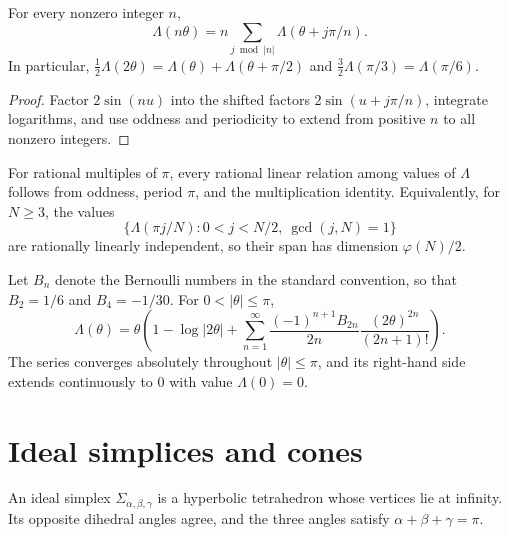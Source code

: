 \begin{lemma}
\label{thurston-ch07-lobachevsky-multiplication}

For every nonzero integer $n$,
\[
\Lambda(n\theta)=n\sum_{j\bmod |n|}\Lambda(\theta+j\pi/n).
\]
In particular, $\frac12\Lambda(2\theta)=\Lambda(\theta)+\Lambda(\theta+\pi/2)$ and $\frac32\Lambda(\pi/3)=\Lambda(\pi/6)$.
\end{lemma}
\begin{proof}
\sketch
Factor $2\sin(nu)$ into the shifted factors $2\sin(u+j\pi/n)$, integrate logarithms, and use oddness and periodicity to extend from positive $n$ to all nonzero integers.
\end{proof}

\begin{conjecture}
\label{thurston-ch07-lobachevsky-relations-conjecture}

For rational multiples of $\pi$, every rational linear relation among values of $\Lambda$ follows from oddness, period $\pi$, and the multiplication identity.  Equivalently, for $N\geq3$, the values
\[
\{\Lambda(\pi j/N):0<j<N/2,\ \gcd(j,N)=1\}
\]
are rationally linearly independent, so their span has dimension $\varphi(N)/2$.
\end{conjecture}

\begin{proposition}
\label{thurston-ch07-lobachevsky-bernoulli-expansion}

Let $B_n$ denote the Bernoulli numbers in the standard convention, so that $B_2=1/6$ and $B_4=-1/30$.  For $0<|\theta|\leq\pi$,
\[
\Lambda(\theta)=\theta\left(1-\log|2\theta|+\sum_{n=1}^{\infty}\frac{(-1)^{n+1}B_{2n}}{2n}\frac{(2\theta)^{2n}}{(2n+1)!}\right).
\]
The series converges absolutely throughout $|\theta|\leq\pi$, and its right-hand side extends continuously to $0$ with value $\Lambda(0)=0$.
\end{proposition}

\section{Ideal simplices and cones}

\begin{definition}
\label{thurston-ch07-ideal-simplex}

An ideal simplex $\Sigma_{\alpha,\beta,\gamma}$ is a hyperbolic tetrahedron whose vertices lie at infinity.  Its opposite dihedral angles agree, and the three angles satisfy $\alpha+\beta+\gamma=\pi$.
\end{definition}

